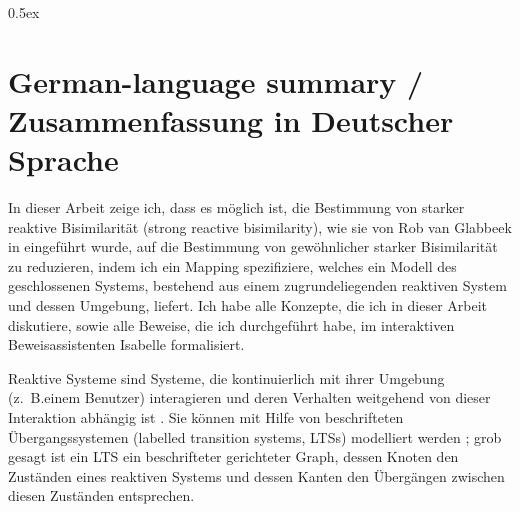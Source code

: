 \documentclass[11pt,a4paper,openany]{book}
\begin{document}
\newpage\null\thispagestyle{empty}\newpage

\tableofcontents
\newpage\null\thispagestyle{empty}\newpage


\parindent 0pt\parskip 0.5ex
















{


}

\appendix




\newpage\null\thispagestyle{empty}

\newpage
{}
\chapter*{German-language summary / Zusammenfassung in Deutscher Sprache}
\thispagestyle{empty}

In dieser Arbeit zeige ich, dass es möglich ist, die Bestimmung von starker reaktive Bisimilarität (strong reactive bisimilarity), wie sie von Rob van Glabbeek in \cite{rbs} eingeführt wurde, auf die Bestimmung von gewöhnlicher starker Bisimilarität zu reduzieren, indem ich ein Mapping spezifiziere, welches ein Modell des geschlossenen Systems, bestehend aus einem zugrundeliegenden reaktiven System und dessen Umgebung, liefert. Ich habe alle Kon\-zepte, die ich in dieser Arbeit diskutiere, sowie alle Beweise, die ich durchgeführt habe, im interaktiven Beweisassistenten Isabelle formalisiert.

Reaktive Systeme sind Systeme, die kontinuierlich mit ihrer Umgebung (z.\@~B.\@ einem Benutzer) interagieren und deren Verhalten weitgehend von dieser Interaktion abhängig ist \cite{harel85}.
Sie können mit Hilfe von beschrifteten Übergangssystemen (labelled transition systems, LTSs) modelliert werden \cite{keller76}; grob gesagt ist ein LTS ein beschrifteter gerichteter Graph, dessen Knoten den Zuständen eines reaktiven Systems und dessen Kanten den Übergängen zwischen diesen Zuständen entsprechen.
\end{document}
